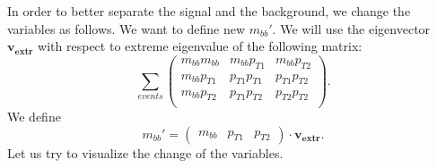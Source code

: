 In order to better separate the signal and the background, we change the variables as follows. 
We want to define new $m_{bb}'$. We will use the eigenvector $\boldsymbol{v_{extr}}$ with respect to extreme eigenvalue of the following matrix:
\begin{equation}
 \sum_{events} \left(
		    \begin{array}{ccc}
                      m_{bb}m_{bb} & m_{bb}p_{T1} & m_{bb}p_{T2}\\
                      m_{bb}p_{T1} & p_{T1}p_{T1} & p_{T1}p_{T2}\\
                      m_{bb}p_{T2} & p_{T1}p_{T2} & p_{T2}p_{T2}\\
                     \end{array}
                \right).
\end{equation}
We define
\begin{equation}
 m_{bb}'
 =
 \left(
 \begin{array}{ccc}
       m_{bb} & p_{T1} & p_{T2} 
       \end{array}
\right) \cdot \boldsymbol{v_{extr}}.
\end{equation}
Let us try to visualize the change of the variables. 


